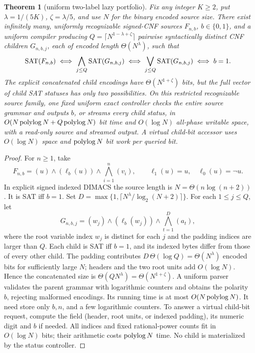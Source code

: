 \documentclass[11pt]{article}
\newtheorem{theorem}{Theorem}
\begin{document}
\begin{theorem}[uniform two-label lazy portfolio]\label{port}
Fix any integer \(K\ge2\), put \(\lambda=1/(5K)\), \(\zeta=\lambda/5\), and use \(N\) for the binary encoded source size. There exist infinitely many, uniformly recognizable signed-CNF sources \(F_{n,b}\), \(b\in\{0,1\}\), and a uniform compiler producing \(Q=\lceil N^{1-\lambda+\zeta}\rceil\) pairwise syntactically distinct CNF children \(G_{n,b,j}\), each of encoded length \(\Theta(N^\lambda)\), such that
\[
 {\rm SAT}(F_{n,b}) \iff \bigwedge_{j\le Q}{\rm SAT}(G_{n,b,j})
 \iff \bigvee_{j\le Q}{\rm SAT}(G_{n,b,j})\iff b=1.
\]
The explicit concatenated child encodings have \(\Theta(N^{1+\zeta})\) bits, but the full vector of child SAT statuses has only two possibilities. On this restricted recognizable source family, one fixed uniform exact controller checks the entire source grammar and outputs \(b\), or streams every child status, in \(O(N\,{\rm polylog}\,N+Q\,{\rm polylog}\,N)\) bit time and \(O(\log N)\) all-phase writable space, with a read-only source and streamed output. A virtual child-bit accessor uses \(O(\log N)\) space and \({\rm polylog}\,N\) bit work per queried bit.
\end{theorem}
\begin{proof}
For \(n\ge1\), take
\[
 F_{n,b}=(u)\wedge(\ell_b(u))\wedge\bigwedge_{i=1}^{n}(v_i),\qquad
 \ell_1(u)=u,\quad\ell_0(u)=\neg u.
\]
In explicit signed indexed DIMACS the source length is \(N=\Theta(n\log(n+2))\). It is SAT iff \(b=1\). Set \(D=\max\{1,\lceil N^\lambda/\log_2(N+2)\rceil\}\). For each \(1\le j\le Q\), let
\[
 G_{n,b,j}=(w_j)\wedge(\ell_b(w_j))
           \wedge\bigwedge_{t=1}^{D}(a_t),
\]
where the root variable index \(w_j\) is distinct for each \(j\) and the padding indices are larger than \(Q\). Each child is SAT iff \(b=1\), and its indexed bytes differ from those of every other child. The padding contributes \(D\,\Theta(\log Q)=\Theta(N^\lambda)\) encoded bits for sufficiently large \(N\); headers and the two root units add \(O(\log N)\). Hence the concatenated size is \(\Theta(QN^\lambda)=\Theta(N^{1+\zeta})\).
A uniform parser validates the parent grammar with logarithmic counters and obtains the polarity \(b\), rejecting malformed encodings. Its running time is at most \(O(N\,{\rm polylog}\,N)\). It need store only \(b,n\), and a few logarithmic counters. To answer a virtual child-bit request, compute the field (header, root units, or indexed padding), its numeric digit and \(b\) if needed. All indices and fixed rational-power counts fit in \(O(\log N)\) bits; their arithmetic costs \({\rm polylog}\,N\) time. No child is materialized by the status controller.
\end{proof}
\end{document}
